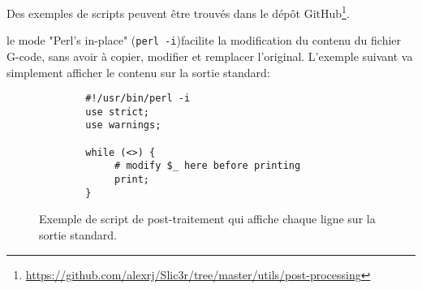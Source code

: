 Des exemples de scripts peuvent \^etre trouv\'es dans le d\'ep\^ot GitHub\footnote{\url{https://github.com/alexrj/Slic3r/tree/master/utils/post-processing}}.


le mode "Perl's in-place" (\texttt{perl -i})facilite la modification du contenu du fichier G-code, sans avoir \`a copier, modifier et remplacer l'original. L'exemple suivant va simplement afficher le contenu sur la sortie standard:

\begin{figure}[H]
\small
\begin{verbatim}
        #!/usr/bin/perl -i
        use strict;
        use warnings;

        while (<>) {
             # modify $_ here before printing
             print;
        }
\end{verbatim}
\caption{Exemple de script de post-traitement qui affiche chaque ligne sur la sortie standard.}
\label{fig:exaple_post_processing_script_print_lines}
\end{figure}

